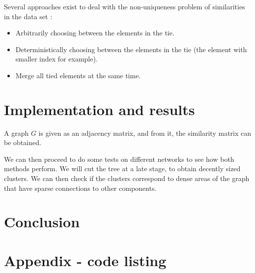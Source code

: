 \documentclass[12pt,a4paper]{article}
\begin{document}
Several approaches exist to deal with the non-uniqueness problem of
similarities in the data set \cite{nonunique}:

\begin{itemize}
\item Arbitrarily choosing between the elements in the tie.
\item Deterministically choosing between the elements in the tie
  (the element with smaller index for example).
\item Merge all tied elements at the same time.
\end{itemize}


\section{Implementation and results}

A graph $ G $ is given as an adjacency matrix, and from it, the
similarity matrix can be obtained.

We can then proceed to do some tests on different networks to see how
both methods perform. We will cut the tree at a late stage, to obtain
decently sized clusters. We can then check if the clusters correspond
to dense areas of the graph that have sparse connections to other
components.

\section{Conclusion}






\nocite{*}

\appendix
\section{Appendix - code listing}

\inputminted[label=main.py]{python}{../src/main.py}
\hfill
\inputminted[label=measures.py]{python}{../src/measures.py}
\hfill
\inputminted[label=clink.py]{python}{../src/link.py}
\end{document}

